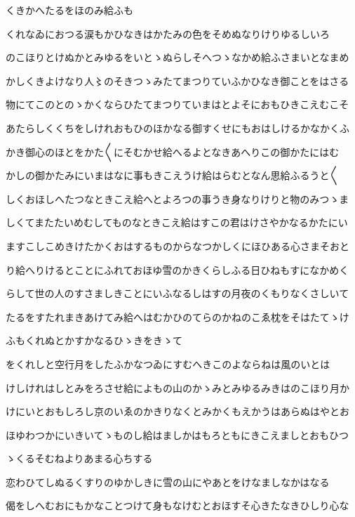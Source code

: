 \documentclass[a4paper,11pt,landscape]{ltjtarticle}
\begin{document}
\par\medskip
くきかへたるをほのみ給ふも
\par\medskip
くれなゐにおつる涙もかひなきはかたみの色をそめぬなりけりゆるしいろ
\par\medskip
のこほりとけぬかとみゆるをいとゝぬらしそへつゝなかめ給ふさまいとなまめ
\par\medskip
かしくきよけなり人〻のそきつゝみたてまつりていふかひなき御ことをはさる
\par\medskip
物にてこのとのゝかくならひたてまつりていまはとよそにおもひきこえむこそ
\par\medskip
あたらしくくちをしけれおもひのほかなる御すくせにもおはしけるかなかくふ
\par\medskip
かき御心のほとをかた〱にそむかせ給へるよとなきあへりこの御かたにはむ
\par\medskip
かしの御かたみにいまはなに事もきこえうけ給はらむとなん思給ふるうと〱
\par\medskip
しくおほしへたつなときこえ給へとよろつの事うき身なりけりと物のみつゝま
\par\medskip
しくてまたたいめむしてものなときこえ給はすこの君はけさやかなるかたにい
\par\medskip
ますこしこめきけたかくおはするものからなつかしくにほひある心さまそおと
\par\medskip
り給へりけるとことにふれておほゆ雪のかきくらしふる日ひねもすになかめく
\par\medskip
らして世の人のすさましきことにいふなるしはすの月夜のくもりなくさしいて
\par\medskip
たるをすたれまきあけてみ給へはむかひのてらのかねのこゑ枕をそはたてゝけ
\par\medskip
ふもくれぬとかすかなるひゝきをきゝて
\par\medskip
をくれしと空行月をしたふかなつゐにすむへきこのよならねは風のいとは
\par\medskip
けしけれはしとみをろさせ給によもの山のかゝみとみゆるみきはのこほり月か
\par\medskip
けにいとおもしろし京のいゑのかきりなくとみかくもえかうはあらぬはやとお
\par\medskip
ほゆわつかにいきいてゝものし給はましかはもろともにきこえましとおもひつ
\par\medskip
ゝくるそむねよりあまる心ちする
\par\medskip
恋わひてしぬるくすりのゆかしきに雪の山にやあとをけなましなかはなる
\par\medskip
偈をしへむおにもかなことつけて身もなけむとおほすそ心きたなきひしり心な
\par\medskip
\end{document}
